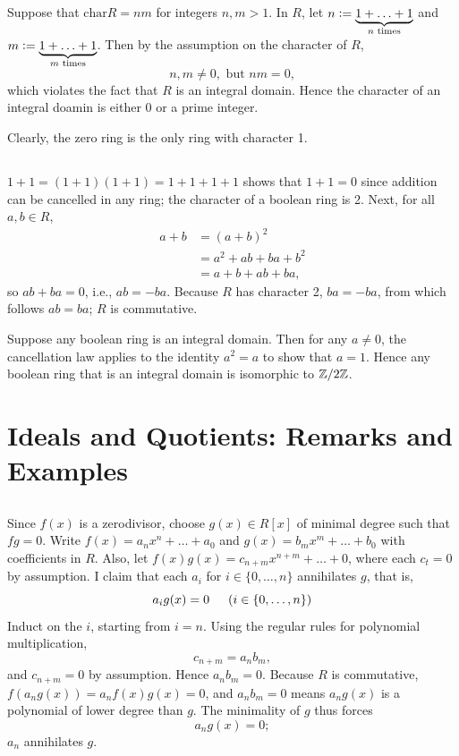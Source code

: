 \documentclass[12pt]{article}
\begin{document}
\setcounter{subsection}{13}
\subsection{}
Suppose that $\text{char} R = nm$ for integers $n, m > 1$. 
In $R$, let $n \vcentcolon= \underbrace{1 + \ldots + 1}_{n \text{ times}}$ and $m \vcentcolon= \underbrace{1 + \ldots + 1}_{m \text{ times}}$. 
Then by the assumption on the character of $R$, 
$$n, m \neq 0, \text{ but } nm = 0,$$
which violates the fact that $R$ is an integral domain. 
Hence the character of an integral doamin is either 0 or a prime integer. 

Clearly, the zero ring is the only ring with character 1. 

\subsection{} 
$1 + 1 = (1 + 1)(1 + 1) = 1 + 1 + 1 + 1$ shows that $1 + 1 = 0$ since addition can be cancelled in any ring;
the character of a boolean ring is 2. 
Next, for all $a, b \in R$, 
\begin{align*}
  a + b & = (a + b)^2 \\ 
        & = a^2 + ab + ba + b^2 \\ 
        & = a + b + ab + ba,
\end{align*}
so $ab + ba = 0$, 
i.e., $ab = -ba$. 
Because $R$ has character 2, $ba = -ba$, from which follows $ab = ba$;
$R$ is commutative. 

Suppose any boolean ring is an integral domain. 
Then for any $a \neq 0$, the cancellation law applies to the identity $a^2 = a$ to show that $a = 1$. 
Hence any boolean ring that is an integral domain is isomorphic to $\mathbb{Z} / 2\mathbb{Z}$. 

\section{Ideals and Quotients: Remarks and Examples}
\setcounter{subsection}{8}
\subsection{} 
Since $f(x)$ is a zerodivisor, choose $g(x) \in R[x]$ of minimal degree such that $fg = 0$. 
Write $f(x) = a_n x^n + \ldots + a_0$ and $g(x) = b_m x^m + \ldots + b_0$ with coefficients in $R$.  
Also, let $f(x)g(x) = c_{n + m} x^{n + m} + \ldots + 0$, where each $c_{t} = 0$ by assumption. 
I claim that each $a_i$ for $i \in \{0, \ldots, n\}$ annihilates $g$, that is, 
$$a_i g(x) = 0 \hspace{1.5em} (i \in \{0, \ldots, n\})$$
Induct on the $i$, starting from $i = n$. 
Using the regular rules for polynomial multiplication, 
$$c_{n + m} = a_n b_m,$$
and $c_{n + m} = 0$ by assumption. 
Hence $a_n b_m = 0$. 
Because $R$ is commutative, $f (a_n g(x)) = a_n f(x) g(x) = 0$, and $a_n b_m = 0$ means $a_{n} g(x)$ is a polynomial of lower degree than $g$.  
The minimality of $g$ thus forces 
$$a_n g(x) = 0;$$
$a_n$ annihilates $g$. 
\end{document}
